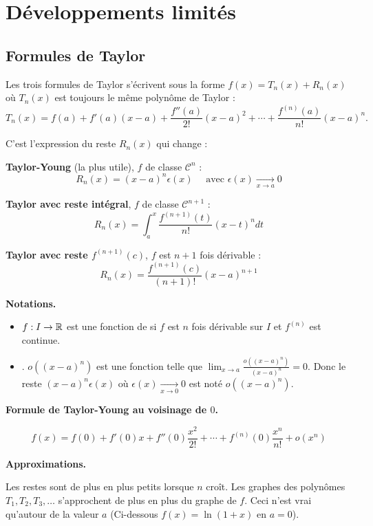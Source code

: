 \documentclass[10pt,class=article,crop=false]{standalone}
\begin{document}
	
\section{Développements limités}

\begin{multicols}{2}

\subsection{Formules de Taylor}

Les trois formules de Taylor s'écrivent sous la forme
$f(x) = T_n(x) + R_n(x)$
où $T_n(x)$ est toujours le même polynôme de Taylor :
$$T_n(x) =f(a)+f'(a)(x-a)+\frac{f''(a)}{2!}(x-a)^2+\cdots
+\frac{f^{(n)}(a)}{n!}(x-a)^n.$$

C'est l'expression du reste $R_n(x)$ qui change :

\textbf{Taylor-Young} (la plus utile), $f$ de classe $\mathcal{C}^{n}$ :
$$R_n(x) = (x-a)^n\epsilon(x) \quad \text{ avec } \epsilon(x) \xrightarrow[x\to a]{} 0$$

\textbf{Taylor avec reste intégral}, $f$ de classe $\mathcal{C}^{n+1}$ :
$$R_n(x) = \int_a^x \frac{f^{(n+1)}(t)}{n!}(x-t)^ndt$$

\textbf{Taylor avec reste $f^{(n+1)}(c)$}, $f$ est $n+1$ fois dérivable :
$$R_n(x) = \frac{f^{(n+1)}(c)}{(n+1)!}(x-a)^{n+1}$$




\textbf{Notations.}

\begin{itemize}
	\item  $f : I \to \mathbb{R}$ est une fonction de  si $f$ est $n$ fois dérivable sur $I$ et $f^{(n)}$ est continue.
	\item \og {} \fg{}. $o((x-a)^n)$ est une fonction telle que $\lim_{x\to a}\frac{o((x-a)^n)}{(x-a)^n}=0$.
	Donc le reste $(x-a)^n\epsilon(x)$ où $\epsilon(x) \xrightarrow[x\to 0]{} 0$
	est noté $o((x-a)^n)$.
\end{itemize}	


\textbf{Formule de Taylor-Young au voisinage de $0$.}

$$f(x)= f(0)+f'(0)x+f''(0)\frac{x^2}{2!}+\cdots
+f^{(n)}(0)\frac{x^n}{n!} + o(x^n)$$

\textbf{Approximations.}

Les restes sont de plus en plus petits lorsque $n$ croît.
Les graphes des polynômes $T_1, T_2, T_3,\ldots$ s'approchent de plus en plus du graphe de $f$. Ceci n'est vrai qu'autour de la valeur $a$ (Ci-dessous $f(x) = \ln(1+x)$ en $a=0$).


\end{multicols}
\end{document}
